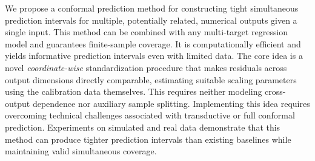 We propose a conformal prediction method for constructing tight simultaneous prediction intervals for multiple, potentially related, numerical outputs given a single input. This method can be combined with any multi-target regression model and guarantees finite-sample coverage. It is computationally efficient and yields informative prediction intervals even with limited data. The core idea is a novel \emph{coordinate-wise} standardization procedure that makes residuals across output dimensions directly comparable, estimating suitable scaling parameters using the calibration data themselves. This requires neither modeling cross-output dependence nor auxiliary sample splitting. Implementing this idea requires overcoming technical challenges associated with transductive or full conformal prediction. Experiments on simulated and real data demonstrate that this method can produce tighter prediction intervals than existing baselines while maintaining valid simultaneous coverage.

